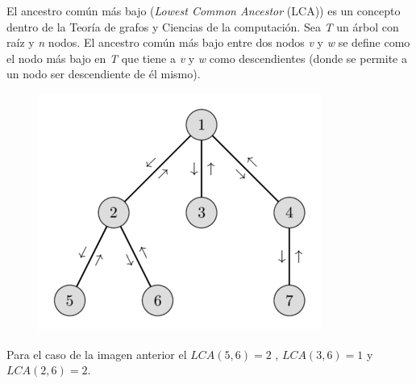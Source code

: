 El ancestro común más bajo ({\em Lowest Common Ancestor} (LCA)) es un concepto dentro de la Teoría de grafos y Ciencias de la computación. Sea {\em T} un árbol con raíz y {\em n} nodos. El ancestro común más bajo entre dos nodos {\em v} y {\em w} se define como el nodo más bajo en {\em T} que tiene a {\em v} y {\em w} como descendientes (donde se permite a un nodo ser descendiente de él mismo).

\begin{figure}[!h]
	\centering
	\includegraphics[width=0.35\linewidth]{img/LCA_Euler}

	\label{fig:lcaeuler}
\end{figure} 

Para el caso de la imagen anterior el $LCA(5,6)=2$ , $LCA(3,6)=1$ y $LCA(2,6)=2$.